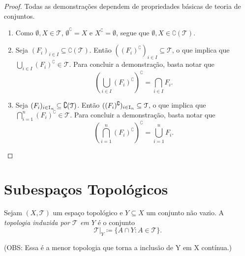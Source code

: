 \begin{proof} Todas as demonstrações dependem de propriedades básicas de teoria de conjuntos.
	\begin{enumerate}
	\item Como $\emptyset,X \in \mathcal T$, $\emptyset^\complement = X$ e $X^\complement = \emptyset$, segue que $\emptyset,X \in \complement (\mathcal T)$.
	
	\item  Seja $(F_i)_{i \in I} \subseteq \complement (\mathcal T)$. Então $((F_i)^\complement)_{i \in I} \subseteq \mathcal T$, o que implica que $\bigcup_{i \in I} (F_i)^\complement \in \mathcal T$. Para concluir a demonstração, basta notar que
	\begin{equation*}
	\left( \bigcup_{i \in I} (F_i)^\complement \right)^\complement = \bigcap_{i \in I} F_i.
	\end{equation*}
	
	\item Seja $(F_i)_{i \in \mathtt I_n} \subseteq \complement (\mathcal T)$. Então $((F_i)^\complement)_{i \in \mathtt I_n} \subseteq \mathcal T$, o que implica que $\bigcap_{i=1}^n (F_i)^\complement \in \mathcal T$. Para concluir a demonstração, basta notar que
	\begin{equation*}
	\left( \bigcap_{i=1}^n (F_i)^\complement \right)^\complement = \bigcup_{i=1}^n F_i.
	\end{equation*}
\qedhere
	\end{enumerate}
\end{proof}

\section{Subespaços Topológicos}

\begin{defi}
	Sejam $(X,\mathcal T)$ um espaço topológico e $Y \subseteq X$ um conjunto não vazio. A \emph{topologia induzida por $\mathcal T$ em $Y$} é o conjunto
	\begin{equation*}
	\mathcal T|_Y \coloneqq \{A \cap Y : A \in \mathcal T\}.
	\end{equation*}
\end{defi}

(OBS: Essa é a menor topologia que torna a inclusão de Y em X contínua.)

